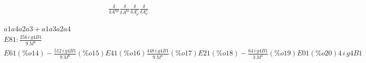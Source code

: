 \documentclass[aps,preprint,preprintnumbers,nofootinbib,showpacs,prd]{revtex4-1}
\newcommand{\nbea}{\begin{eqnarray*}}
\newcommand{\neea}{\end{eqnarray*}}
\begin{document}
%
\nbea
\frac{\delta}{\delta A^{a\mu}}\frac{\delta}{\delta A^{b\nu}}\frac{\delta}{\delta A^c_{\mu}}\frac{\delta}{\delta A^c_{\nu}}
\neea
%


\nbea
a1a4a2a3 + a1a3a2a4\\
E81: \frac{256\,i\,g4B1}{9\,{M}^{8}}\\ 
E61(\%o14) -\frac{512\,i\,g4B1}{9\,{M}^{6}}(\%o15) E41(\%o16) \frac{448\,i\,g4B1}{9\,{M}^{4}}(\%o17) E21(\%o18) -\frac{64\,i\,g4B1}{3\,{M}^{2}}(\%o19) E01(\%o20) 4\,i\,g4B1
\neea

\begin{thebibliography}{99}

\end{thebibliography}
\end{document}
